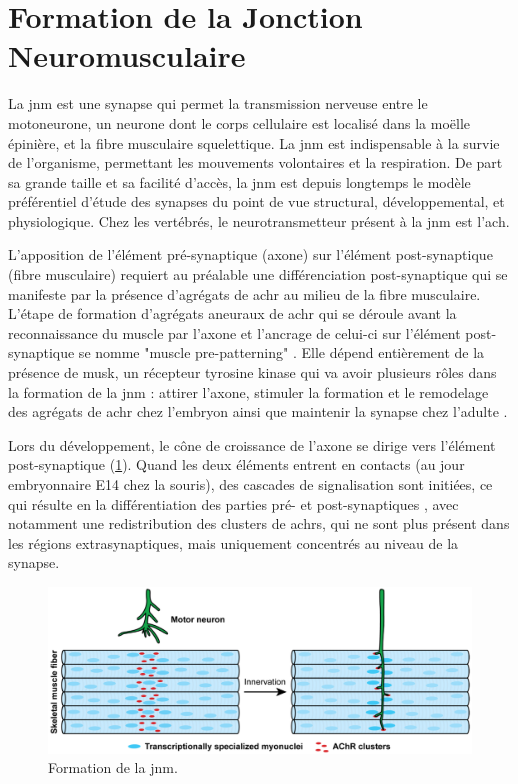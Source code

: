  
\section{Formation de la Jonction Neuromusculaire}
\label{sec:IntroSynapse}
	La \gls{jnm} est une synapse qui permet la transmission nerveuse entre le motoneurone, un neurone dont le corps cellulaire est localisé dans la moëlle épinière, et la fibre musculaire squelettique. La \gls{jnm} est indispensable à la survie de l'organisme, permettant les mouvements volontaires et la respiration. De part sa grande taille et sa facilité d'accès, la \gls{jnm} est depuis longtemps le modèle préférentiel d'étude des synapses du point de vue structural, développemental, et physiologique. Chez les vertébrés, le neurotransmetteur présent à la \gls{jnm} est l'\gls{ach}. 

	L'apposition de l'élément pré-synaptique (axone) sur l'élément post-synaptique (fibre musculaire) requiert au préalable une différenciation post-synaptique qui se manifeste par la présence d'agrégats de \gls{achr} au milieu de la fibre musculaire. L'étape de formation d'agrégats aneuraux de \gls{achr} qui se déroule avant la reconnaissance du muscle par l'axone et l'ancrage de celui-ci sur l'élément post-synaptique se nomme "muscle pre-patterning" \cite{Wu2010a, Gordon2012}. Elle dépend entièrement de la présence de \gls{musk}, un récepteur tyrosine kinase qui va avoir plusieurs rôles dans la formation de la \gls{jnm} : attirer l'axone, stimuler la formation et le remodelage des agrégats de \gls{achr} chez l'embryon ainsi que maintenir la synapse chez l'adulte \cite{Hesser2006}.

	Lors du développement, le cône de croissance de l'axone se dirige vers l'élément post-synaptique (\cref{fig:FormaJNM}). Quand les deux éléments entrent en contacts (au jour embryonnaire E14 chez la souris), des cascades de signalisation sont initiées, ce qui résulte en la différentiation des parties pré- et post-synaptiques \cite{Sanes1999}, avec notamment une redistribution des clusters de \glspl{achr}, qui ne sont plus présent dans les régions extrasynaptiques, mais uniquement concentrés au niveau de la synapse.

	\begin{figure}[h]
		\includegraphics[width=\textwidth]{./Images/formation_jnm.png}
		\caption{Formation de la \gls{jnm}.} 
		\label{fig:FormaJNM}
	\end{figure}

